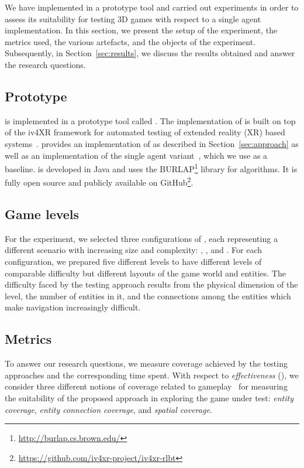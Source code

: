 We have implemented \approach in a prototype tool and carried out experiments in order to assess its suitability for testing 3D games with respect to a single agent \rlacronym implementation. In this section, we present the setup of the experiment, the metrics used, the various artefacts, and the objects of the experiment. Subsequently, in Section~\ref{sec:results}, we discuss the results obtained and answer the research questions.

\subsection{Prototype} \label{sec:prototype}
\approach is implemented in a prototype tool called \tool. The implementation of \tool is built on top of the iv4XR framework for automated testing of extended reality (XR) based systems~\cite{DBLP:conf/icst/PradaPKDVLDKDF20}. \tool provides an implementation of \approach as described in Section~\ref{sec:approach} as well as an implementation of the single agent variant~\cite{DBLP:conf/kbse/FerdousKPS22}, which we use as a baseline. \tool is developed in Java and uses the BURLAP\footnote{\url{http://burlap.cs.brown.edu/}} library for \rlacronym algorithms. It is fully open source and publicly available on GitHub\footnote{
\url{https://github.com/iv4xr-project/iv4xr-rlbt}}.

\subsection{Game levels}
\label{sec:levels}
For the experiment, we selected three configurations of \sut, each representing a different scenario with increasing size and complexity:
\med, \lrg, and \ext. For each configuration, we prepared five different levels to have different levels of comparable difficulty but different layouts of the game world and entities. The difficulty faced by the testing approach results from the physical dimension of the level, the number of entities in it, and the connections among the entities which make navigation increasingly difficult.


\subsection{Metrics} \label{sec:metrics}
To answer our research questions, we measure coverage achieved by the testing approaches and the corresponding time spent. With respect to \emph{effectiveness} (\rqa), we consider three different notions of coverage related to gameplay~\cite{10.1145/3643658.3643920} for measuring the suitability of the proposed approach in exploring the game under test: \emph{entity coverage}, \emph{entity connection coverage}, and \emph{spatial coverage}.

